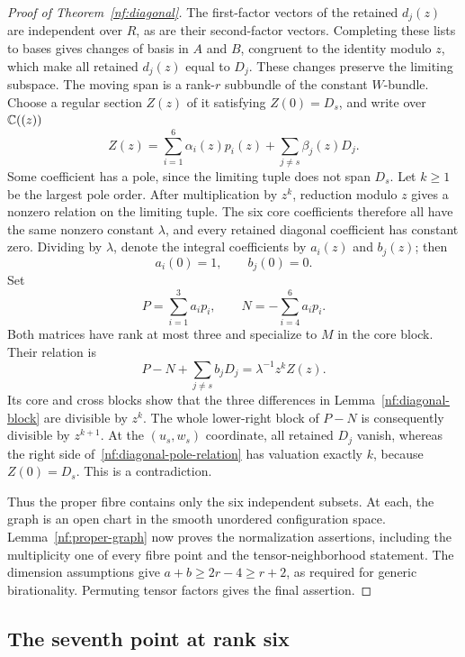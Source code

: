 \begin{proof}[Proof of Theorem~\ref{nf:diagonal}]
The first-factor vectors of the retained $d_j(z)$ are independent
over $R$, as are their second-factor vectors. Completing these lists
to bases gives changes of basis in $A$ and $B$, congruent to the
identity modulo $z$, which make all retained $d_j(z)$ equal to $D_j$.
These changes preserve the limiting subspace. The moving span is a
rank-$r$ subbundle of the constant $W$-bundle. Choose a regular section
$Z(z)$ of it satisfying $Z(0)=D_s$, and write over $\mathbb C((z))$
\[
 Z(z)=\sum_{i=1}^6\alpha_i(z)p_i(z)
                  +\sum_{j\ne s}\beta_j(z)D_j.
\]
Some coefficient has a pole, since the limiting tuple does not span
$D_s$. Let $k\geq1$ be the largest pole order. After multiplication
by $z^k$, reduction modulo $z$ gives a nonzero relation on the limiting
tuple. The six core coefficients therefore all have the same nonzero
constant $\lambda$, and every retained diagonal coefficient has
constant zero. Dividing by $\lambda$, denote the integral
coefficients by $a_i(z)$ and $b_j(z)$; then
\[
 a_i(0)=1,\qquad b_j(0)=0.
\]
Set
\[
 P=\sum_{i=1}^3a_ip_i,\qquad
 N=-\sum_{i=4}^6a_ip_i.
\]
Both matrices have rank at most three and specialize to $M$ in the
core block. Their relation is
\begin{equation}\label{nf:diagonal-pole-relation}
 P-N+\sum_{j\ne s}b_jD_j=\lambda^{-1}z^kZ(z).
\end{equation}
Its core and cross blocks show that the three differences in
Lemma~\ref{nf:diagonal-block} are divisible by $z^k$. The whole
lower-right block of $P-N$ is consequently divisible by $z^{k+1}$.
At the $(u_s,w_s)$ coordinate, all retained $D_j$ vanish, whereas
the right side of~\eqref{nf:diagonal-pole-relation} has valuation
exactly $k$, because $Z(0)=D_s$. This is a contradiction.

Thus the proper fibre contains only the six independent subsets.
At each, the graph is an open chart in the smooth unordered
configuration space. Lemma~\ref{nf:proper-graph} now proves the
normalization assertions, including the multiplicity one of every
fibre point and the tensor-neighborhood statement. The dimension
assumptions give $a+b\geq2r-4\geq r+2$, as required for generic
birationality. Permuting tensor factors gives the final assertion.
\end{proof}

\subsection{The seventh point at rank six}
\label{nf:rank-six-subsection}

